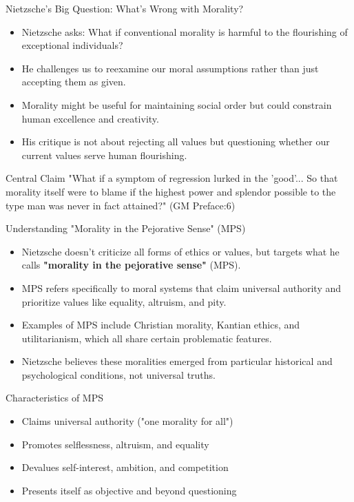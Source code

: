 \documentclass{beamer}
\begin{document}
    \begin{frame}{Nietzsche's Big Question: What's Wrong with Morality?}
    \begin{itemize}
    \item Nietzsche asks: What if conventional morality is harmful to the flourishing of exceptional individuals?
    \item He challenges us to reexamine our moral assumptions rather than just accepting them as given.
    \item Morality might be useful for maintaining social order but could constrain human excellence and creativity.
    \item His critique is not about rejecting all values but questioning whether our current values serve human flourishing.
    \end{itemize}
    
    \begin{alertblock}{Central Claim}
    "What if a symptom of regression lurked in the 'good'... So that morality itself were to blame if the highest power and splendor possible to the type man was never in fact attained?" (GM Preface:6)
    \end{alertblock}
    \end{frame}

    \begin{frame}{Understanding "Morality in the Pejorative Sense" (MPS)}
        \begin{itemize}
        \item Nietzsche doesn't criticize all forms of ethics or values, but targets what he calls \textbf{"morality in the pejorative sense"} (MPS).
        \item MPS refers specifically to moral systems that claim universal authority and prioritize values like equality, altruism, and pity.
        \item Examples of MPS include Christian morality, Kantian ethics, and utilitarianism, which all share certain problematic features.
        \item Nietzsche believes these moralities emerged from particular historical and psychological conditions, not universal truths.
        \end{itemize}
        
        \begin{block}{Characteristics of MPS}
        \begin{itemize}
        \item Claims universal authority ("one morality for all")
        \item Promotes selflessness, altruism, and equality
        \item Devalues self-interest, ambition, and competition
        \item Presents itself as objective and beyond questioning
        \end{itemize}
        \end{block}
        \end{frame}
        
\end{document}
